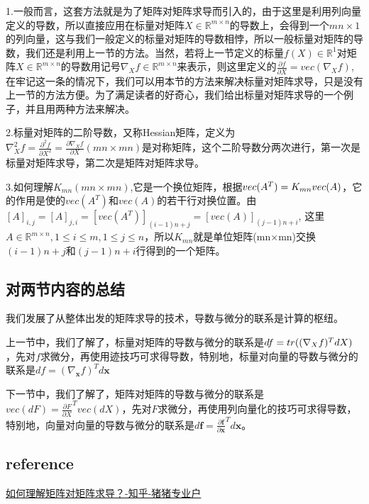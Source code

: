 \documentclass[UTF8]{ctexart}
\begin{document}
		1.一般而言，这套方法就是为了矩阵对矩阵求导而引入的，由于这里是利用列向量定义的导数，所以直接应用在标量对矩阵$X\in \mathbb{R}^{m\times n}$的导数上，会得到一个$mn\times1$的列向量，这与我们一般定义的标量对矩阵的导数相悖，所以一般标量对矩阵的导数，我们还是利用上一节的方法。当然，若将上一节定义的标量$f(X)\in \mathbb{R}^{1}$对矩阵$X\in \mathbb{R}^{m\times n}$的导数用记号$\nabla_X f\in \mathbb{R}^{m\times n}$来表示，则这里定义的$\frac{\partial f}{\partial X}={vec}(\nabla_X f)$,在牢记这一条的情况下，我们可以用本节的方法来解决标量对矩阵求导，只是没有上一节的方法方便。为了满足读者的好奇心，我们给出标量对矩阵求导的一个例子，并且用两种方法来解决。

		2.标量对矩阵的二阶导数，又称Hessian矩阵，定义为$\nabla^2_X f = \frac{\partial^2 f}{\partial X^2} = \frac{\partial \nabla_X f}{\partial X}(mn×mn)$是对称矩阵，这个二阶导数分两次进行，第一次是标量对矩阵求导，第二次是矩阵对矩阵求导。

		3.如何理解$K_{mn}(mn×mn)$,它是一个换位矩阵，根据${vec}(A^T) = K_{mn}\\{vec}(A)$，它的作用是使的${vec}(A^T)$和${vec}(A)$的若干行对换位置。由$[A]_{i,j}=[A]_{j,i}=[{vec}(A^T)]_{(i-1)n+j}=[{vec}(A)]_{(j-1)n+i}$, 这里$A\in \mathbb{R}^{m\times n}, 1 \leq i \leq m, 1 \leq j \leq n$，所以$K_{mn}$就是单位矩阵(mn×mn)交换$(i-1)n+j$和$(j-1)n+i$行得到的一个矩阵。

		\subsection*{对两节内容的总结}
		我们发展了从整体出发的矩阵求导的技术，导数与微分的联系是计算的枢纽。

		上一节中，我们了解了，标量对矩阵的导数与微分的联系是$df =\\ {tr}((\nabla_Xf)^T dX)$，先对$f$求微分，再使用迹技巧可求得导数，特别地，标量对向量的导数与微分的联系是$df = (\nabla_{\boldsymbol{x}}f)^T d\boldsymbol{x}$

		下一节中，我们了解了，矩阵对矩阵的导数与微分的联系是${vec}(dF) = \frac{\partial F}{\partial X}^T {vec}(dX)$，先对$F$求微分，再使用列向量化的技巧可求得导数，特别地，向量对向量的导数与微分的联系是$d\boldsymbol{f} = \frac{\partial \boldsymbol{f}}{\partial \boldsymbol{x}}^Td\boldsymbol{x}$。

	\subsection*{reference}
	\href{https://www.zhihu.com/question/39523290}{如何理解矩阵对矩阵求导？-知乎-猪猪专业户}
\end{document}
